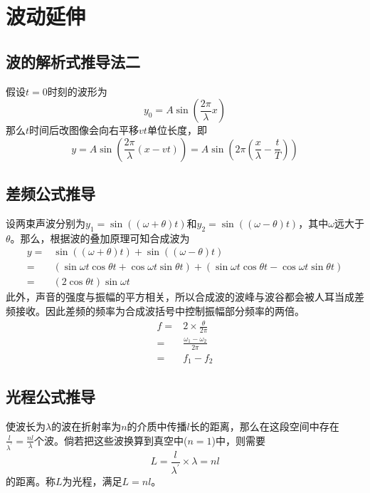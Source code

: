 
\section{波动延伸}

\subsection{波的解析式推导法二}

假设$t=0$时刻的波形为
\begin{equation*}
    y_0=A\sin\left(\frac{2\pi}{\lambda}x\right)
\end{equation*}
那么$t$时间后改图像会向右平移$vt$单位长度，即
\begin{equation*}
    y=A\sin\left(\frac{2\pi}{\lambda}\left(x-vt\right)\right)
    =A\sin\left(2\pi\left(\frac{x}{\lambda}-\frac{t}{T}\right)\right)
\end{equation*}

\subsection{差频公式推导}

设两束声波分别为$y_1=\sin((\omega+\theta)t)$和$y_2=\sin((\omega-\theta)t)$，其中$\omega$远大于$\theta$。那么，根据波的叠加原理可知合成波为
\begin{align*}
    y=&\sin((\omega+\theta)t)+\sin((\omega-\theta)t)\\
    =&(\sin\omega t\cos\theta t+\cos\omega t\sin\theta t)+(\sin\omega t\cos\theta t-\cos\omega t\sin\theta t)\\
    =&(2\cos\theta t)\sin\omega t
\end{align*}
此外，声音的强度与振幅的平方相关，所以合成波的波峰与波谷都会被人耳当成差频接收。因此差频的频率为合成波括号中控制振幅部分频率的两倍。
\begin{align*}
    f=&2\times\frac{\theta}{2\pi}\\
    =&\frac{\omega_1-\omega_2}{2\pi}\\
    =&f_1-f_2
\end{align*}

\subsection{光程公式推导}

使波长为$\lambda$的波在折射率为$n$的介质中传播$l$长的距离，那么在这段空间中存在$\frac{l}{\lambda^\prime}=\frac{nl}{\lambda}$个波。倘若把这些波换算到真空中($n=1$)中，则需要
\begin{equation*}
    L=\frac{l}{\lambda^\prime}\times\lambda=nl
\end{equation*}
的距离。称$L$为光程，满足$L=nl$。

